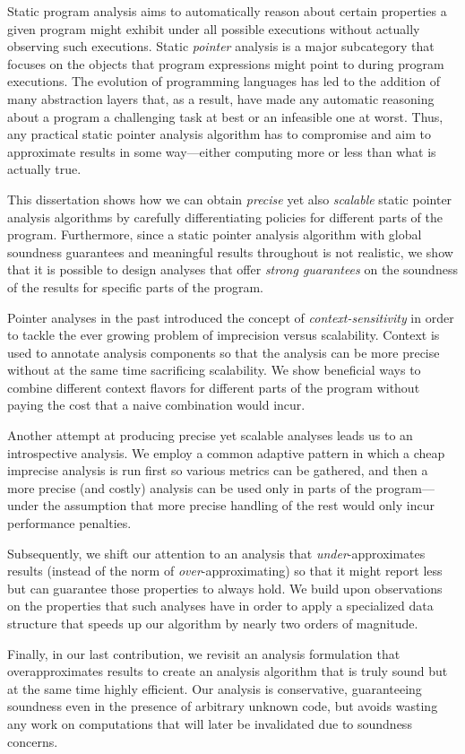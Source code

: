 Static program analysis aims to automatically reason about certain properties a given program might exhibit under all possible executions without actually observing such executions. Static \emph{pointer} analysis is a major subcategory that focuses on the objects that program expressions might point to during program executions. The evolution of programming languages has led to the addition of many abstraction layers that, as a result, have made any automatic reasoning about a program a challenging task at best or an infeasible one at worst. Thus, any practical static pointer analysis algorithm has to compromise and aim to approximate results in some way---either computing more or less than what is actually true.

This dissertation shows how we can obtain \emph{precise} yet also \emph{scalable} static pointer analysis algorithms by carefully differentiating policies for different parts of the program. Furthermore, since a static pointer analysis algorithm with global soundness guarantees and meaningful results throughout is not realistic, we show that it is possible to design analyses that offer \emph{strong guarantees} on the soundness of the results for specific parts of the program.

Pointer analyses in the past introduced the concept of \emph{context-sensitivity} in order to tackle the ever growing problem of imprecision versus scalability. Context is used to annotate analysis components so that the analysis can be more precise without at the same time sacrificing scalability. We show beneficial ways to combine different context flavors for different parts of the program without paying the cost that a naive combination would incur.

Another attempt at producing precise yet scalable analyses leads us to an introspective analysis. We employ a common adaptive pattern in which a cheap imprecise analysis is run first so various metrics can be gathered, and then a more precise (and costly) analysis can be used only in parts of the program---under the assumption that more precise handling of the rest would only incur performance penalties.

Subsequently, we shift our attention to an analysis that \emph{under}-approximates results (instead of the norm of \emph{over}-approximating) so that it might report less but can guarantee those properties to always hold. We build upon observations on the properties that such analyses have in order to apply a specialized data structure that speeds up our algorithm by nearly two orders of magnitude.

Finally, in our last contribution, we revisit an analysis formulation that overapproximates results to create an analysis algorithm that is truly sound but at the same time highly efficient. Our analysis is conservative, guaranteeing soundness even in the presence of arbitrary unknown code, but avoids wasting any work on computations that will later be invalidated due to soundness concerns.